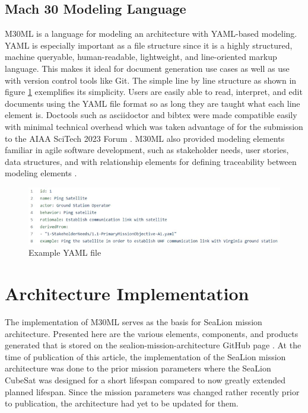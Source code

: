 \documentclass[journal,article,submit,pdftex,moreauthors]{Definitions/mdpi}
\begin{document}
\subsection{Mach 30 Modeling Language}

M30ML is a language for modeling an architecture with YAML-based modeling.  YAML is especially important as a file structure since it is a highly structured, machine queryable, human-readable, lightweight, and line-oriented markup language.  This makes it ideal for document generation use cases as well as use with version control tools like Git.  The simple line by line structure as shown in figure \ref{fig:example_yaml} exemplifies its simplicity.  Users are easily able to read, interpret, and edit documents using the YAML file format so as long they are taught what each line element is.  Doctools such as asciidoctor and bibtex were made compatible easily with minimal technical overhead which was taken advantage of for the submission to the AIAA SciTech 2023 Forum \cite{scitech_proceeding}.  M30ML also provided modeling elements familiar in agile software development, such as stakeholder needs, user stories, data structures, and with relationship elements for defining traceability between modeling elements \cite{mach30_git}.

\begin{figure}[H]
    \includegraphics[width=10.5 cm]{assets/user_story.png}
    \caption{Example YAML file}
	\label{fig:example_yaml}
    \end{figure}   
\unskip

\section{Architecture Implementation}
The implementation of M30ML serves as the basis for SeaLion mission architecture.  Presented here are the various elements, components, and products generated that is stored on the sealion-mission-architecture GitHub page \cite{sealion_mission_architecture}.  At the time of publication of this article, the implementation of the SeaLion mission architecture was done to the prior mission parameters where the SeaLion CubeSat was designed for a short lifespan compared to now greatly extended planned lifespan.  Since the mission parameters was changed rather recently prior to publication, the architecture had yet to be updated for them.
\end{document}
